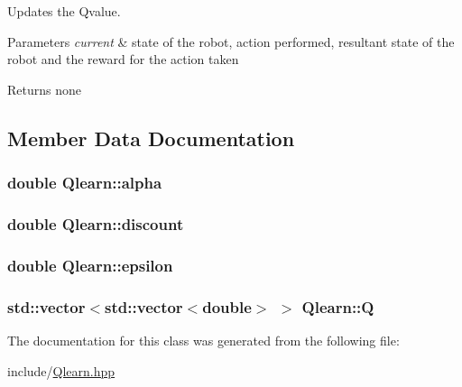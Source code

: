 Updates the Qvalue. 


\begin{DoxyParams}{Parameters}
{\em current} & state of the robot, action performed, resultant state of the robot and the reward for the action taken \\
\hline
\end{DoxyParams}
\begin{DoxyReturn}{Returns}
none 
\end{DoxyReturn}


\subsection{Member Data Documentation}
\subsubsection[{\texorpdfstring{alpha}{alpha}}]{\setlength{\rightskip}{0pt plus 5cm}double Qlearn\+::alpha}\hypertarget{classQlearn_afea088cbb6979c88aebe6a686d5cb0a7}{}\label{classQlearn_afea088cbb6979c88aebe6a686d5cb0a7}
\subsubsection[{\texorpdfstring{discount}{discount}}]{\setlength{\rightskip}{0pt plus 5cm}double Qlearn\+::discount}\hypertarget{classQlearn_aae7a6f1900f66914f090e81263fa9d5e}{}\label{classQlearn_aae7a6f1900f66914f090e81263fa9d5e}
\subsubsection[{\texorpdfstring{epsilon}{epsilon}}]{\setlength{\rightskip}{0pt plus 5cm}double Qlearn\+::epsilon}\hypertarget{classQlearn_a6a70fe527dd3ab0a3f4245ab5437021e}{}\label{classQlearn_a6a70fe527dd3ab0a3f4245ab5437021e}
\subsubsection[{\texorpdfstring{Q}{Q}}]{\setlength{\rightskip}{0pt plus 5cm}std\+::vector$<$std\+::vector$<$double$>$ $>$ Qlearn\+::Q}\hypertarget{classQlearn_aca968a8057ef5deed1436e09436f197b}{}\label{classQlearn_aca968a8057ef5deed1436e09436f197b}


The documentation for this class was generated from the following file\+:\begin{DoxyCompactItemize}
\item 
include/\hyperlink{Qlearn_8hpp}{Qlearn.\+hpp}\end{DoxyCompactItemize}
